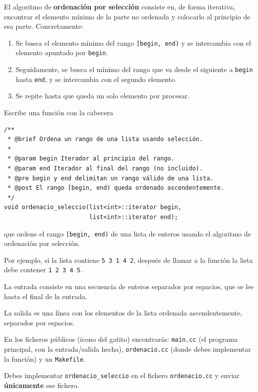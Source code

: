 

\Statement

El algoritmo de \textbf{ordenación por selección} consiste en, de forma iterativa, encontrar el elemento mínimo de la parte no ordenada y colocarlo al principio de esa parte. Concretamente:

\begin{enumerate}
\item Se busca el elemento mínimo del rango \verb|[begin, end)| y se intercambia con el elemento apuntado por \verb|begin|.
\item Seguidamente, se busca el mínimo del rango que va desde el siguiente a \verb|begin| hasta \verb|end|, y se intercambia con el segundo elemento.
\item Se repite hasta que queda un solo elemento por procesar.
\end{enumerate}

Escribe una función con la cabecera
\begin{verbatim}
/**
 * @brief Ordena un rango de una lista usando selección.
 *
 * @param begin Iterador al principio del rango.
 * @param end Iterador al final del rango (no incluido).
 * @pre begin y end delimitan un rango válido de una lista.
 * @post El rango [begin, end) queda ordenado ascendentemente.
 */
void ordenacio_seleccio(list<int>::iterator begin,
                        list<int>::iterator end);
\end{verbatim}
que ordene el rango \verb|[begin, end)| de una lista de enteros usando el algoritmo de ordenación por selección.

Por ejemplo, si la lista contiene \verb|5 3 1 4 2|, después de llamar a la función la lista debe contener \verb|1 2 3 4 5|.

\Input

La entrada consiste en una secuencia de enteros separados por espacios, que se lee hasta el final de la entrada.

\Output

La salida es una línea con los elementos de la lista ordenada ascendentemente, separados por espacios.

\Observation

En los ficheros públicos (icono del gatito) encontrarás: \verb|main.cc| (el programa principal, con la entrada/salida hecha), \verb|ordenacio.cc| (donde debes implementar la función) y un \verb|Makefile|.

Debes implementar \verb|ordenacio_seleccio| en el fichero \verb|ordenacio.cc| y enviar \textbf{únicamente} ese fichero.

\SampleTwoCol
